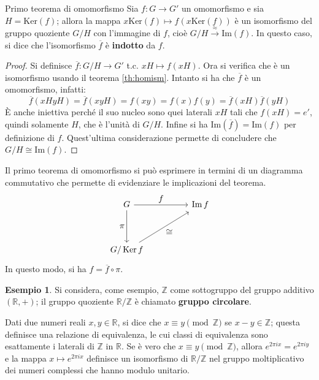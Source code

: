\documentclass[11pt, a4paper]{scrartcl}
\theoremstyle{definition}
\newtheorem{esempio}{Esempio}
\numberwithin{esempio}{section}
\theoremstyle{definition}
\numberwithin{obs}{section}
\numberwithin{nota}{section}
\numberwithin{equation}{subsection}
\begin{document}
\begin{teorema}
	{Primo teorema di omomorfismo}{}
	Sia $f:G\to G'$ un omomorfismo e sia $H= \mathrm{Ker} (f)$; allora la mappa $x \mathrm{Ker} (f) \mapsto f(x \mathrm{Ker} (f))$ \`e un isomorfismo del gruppo quoziente $G / H$ con l'immagine di $f$, cio\`e $G/H \stackrel{\approx}{\longrightarrow}\mathrm{Im} (f)$.
In questo caso, si dice che l'isomorfismo $\overline{f}$ \`e \textbf{indotto} da $f$.
	\begin{proof}
		Si definisce $\overline{f}: G / H \to G' $ t.c. $ xH \mapsto f(xH)$. Ora si verifica che \`e un isomorfismo usando il teorema \ref{th:homism}. Intanto si ha che $\overline{f}$ \`e un omomorfismo, infatti:
		\[
		\overline{f}(xHyH) = \overline{f}(xyH) = f(xy) = f(x)f(y) = \overline{f}(xH) \overline{f}(yH)
		\] 
\`E anche iniettiva perch\'e il suo nucleo sono quei laterali $xH$ tali che $f(xH) = e'$, quindi solamente $H$, che \`e l'unit\`a di $G / H$.
Infine si ha $\mathrm{Im} (\overline{f}) = \mathrm{Im} (f)$ per definizione di $f$.
Quest'ultima considerazione permette di concludere che $G / H \cong \mathrm{Im} (f)$.
	\end{proof}
\end{teorema}
\noindent Il primo teorema di omomorfismo si pu\`o esprimere in termini di un diagramma commutativo che permette di evidenziare le implicazioni del teorema.
\[\begin{tikzcd}
	G && {\operatorname{Im}f} \\
	\\
	{G/\operatorname{Ker} f}
	\arrow["\displaystyle f", from=1-1, to=1-3]
	\arrow["\displaystyle \pi"', from=1-1, to=3-1]
	\arrow["\displaystyle \cong"', from=3-1, to=1-3]
\end{tikzcd}\]
In questo modo, si ha $f = \overline{f}\circ \pi$.
\begin{esempio}
Si considera, come esempio, $\mathbb{Z}$ come sottogruppo del gruppo additivo $(\mathbb{R}, + )$; il gruppo quoziente $\mathbb{R} / \mathbb{Z}$ \`e chiamato \textbf{gruppo circolare}. 

Dati due numeri reali $x,y \in \mathbb{R}$, si dice che $x \equiv y \pmod{\mathbb{Z}}$ se $x - y \in \mathbb{Z}$; questa definisce una relazione di equivalenza, le cui classi di equivalenza sono esattamente i laterali di $\mathbb{Z}$ in $\mathbb{R}$. 
Se \`e vero che $x \equiv y \pmod{\mathbb{Z}}$, allora $e^{2\pi i x} = e^{2\pi i y} $ e la mappa $x \mapsto e^{2\pi i x} $ definisce un isomorfismo di $\mathbb{R} / \mathbb{Z}$ nel gruppo moltiplicativo dei numeri complessi che hanno modulo unitario.
\end{esempio}
\end{document}
